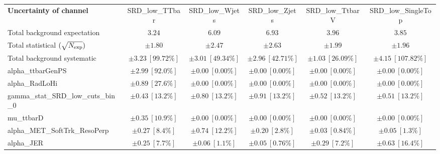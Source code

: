 
\begin{sidewaystable}
\begin{center}
\setlength{\tabcolsep}{0.0pc}
\begin{tabular*}{\textwidth}{@{\extracolsep{\fill}}lccccc}
\noalign{\smallskip}\hline\noalign{\smallskip}
{\bf Uncertainty of channel}                                    & SRD\_low\_TTbar            & SRD\_low\_Wjets            & SRD\_low\_Zjets            & SRD\_low\_TtbarV            & SRD\_low\_SingleTop            \\
\noalign{\smallskip}\hline\noalign{\smallskip}
Total background expectation             &  $3.24$        &  $6.09$        &  $6.93$        &  $3.96$        &  $3.85$       \\
\noalign{\smallskip}\hline\noalign{\smallskip}
Total statistical $(\sqrt{N_{\rm exp}})$              & $\pm 1.80$        & $\pm 2.47$        & $\pm 2.63$        & $\pm 1.99$        & $\pm 1.96$       \\
Total background systematic               & $\pm 3.23\ [99.72\%] $        & $\pm 3.01\ [49.34\%] $        & $\pm 2.96\ [42.71\%] $        & $\pm 1.03\ [26.09\%] $        & $\pm 4.15\ [107.82\%] $             \\
\noalign{\smallskip}\hline\noalign{\smallskip}
\noalign{\smallskip}\hline\noalign{\smallskip}
alpha\_ttbarGenPS         & $\pm 2.99\ [92.0\%] $          & $\pm 0.00\ [0.00\%] $          & $\pm 0.00\ [0.00\%] $          & $\pm 0.00\ [0.00\%] $          & $\pm 0.00\ [0.00\%] $       \\
alpha\_RadLoHi         & $\pm 0.89\ [27.6\%] $          & $\pm 0.00\ [0.00\%] $          & $\pm 0.00\ [0.00\%] $          & $\pm 0.00\ [0.00\%] $          & $\pm 0.00\ [0.00\%] $       \\
gamma\_stat\_SRD\_low\_cuts\_bin\_0         & $\pm 0.43\ [13.2\%] $          & $\pm 0.80\ [13.2\%] $          & $\pm 0.91\ [13.2\%] $          & $\pm 0.52\ [13.2\%] $          & $\pm 0.51\ [13.2\%] $       \\
mu\_ttbarD         & $\pm 0.35\ [10.9\%] $          & $\pm 0.00\ [0.00\%] $          & $\pm 0.00\ [0.00\%] $          & $\pm 0.00\ [0.00\%] $          & $\pm 0.00\ [0.00\%] $       \\
alpha\_MET\_SoftTrk\_ResoPerp         & $\pm 0.27\ [8.4\%] $          & $\pm 0.74\ [12.2\%] $          & $\pm 0.20\ [2.8\%] $          & $\pm 0.03\ [0.84\%] $          & $\pm 0.05\ [1.3\%] $       \\
alpha\_JER         & $\pm 0.25\ [7.7\%] $          & $\pm 0.06\ [1.1\%] $          & $\pm 0.05\ [0.76\%] $          & $\pm 0.29\ [7.2\%] $          & $\pm 0.63\ [16.4\%] $       \\

\end{tabular*}
\end{center}
\end{sidewaystable}
